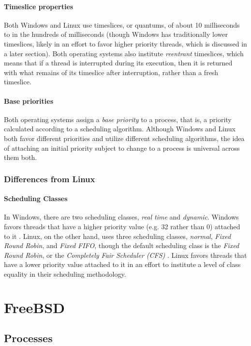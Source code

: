 \documentclass[letterpaper,10pt,titlepage]{article}
\begin{document}
\paragraph{Timeslice properties}
Both Windows and Linux use timeslices, or quantums, of about 10 milliseconds to in the hundreds of milliseconds (though Windows has traditionally lower timeslices, likely in an effort to favor higher priority threads, which is discussed in a later section). Both operating systems also institute \emph{reentrant} timeslices, which means that if a thread is interrupted during its execution, then it is returned with what remains of its timeslice after interruption, rather than a fresh timeslice.
\paragraph{Base priorities}
Both operating systems assign a \emph{base priority} to a process, that is, a priority calculated according to a scheduling algorithm. Although Windows and Linux both favor different priorities and utilize different scheduling algorithms, the idea of attaching an initial priority subject to change to a process is universal across them both.
\subsubsection{Differences from Linux}
\paragraph{Scheduling Classes} 
In Windows, there are two scheduling classes, \emph{real time} and \emph{dynamic}. Windows favors threads that have a higher priority value (e.g. 32 rather than 0) attached to it \cite{rus122}. Linux, on the other hand, uses three scheduling classes, \emph{normal}, \emph{Fixed Round Robin}, and \emph{Fixed FIFO}, though the default scheduling class is the \emph{Fixed Round Robin}, or the \emph{Completely Fair Scheduler (CFS)} \cite{ker10}. Linux favors threads that have a lower priority value attached to it in an effort to institute a level of class equality in their scheduling methodology.

\section{FreeBSD}
\subsection{Processes}
\end{document}
